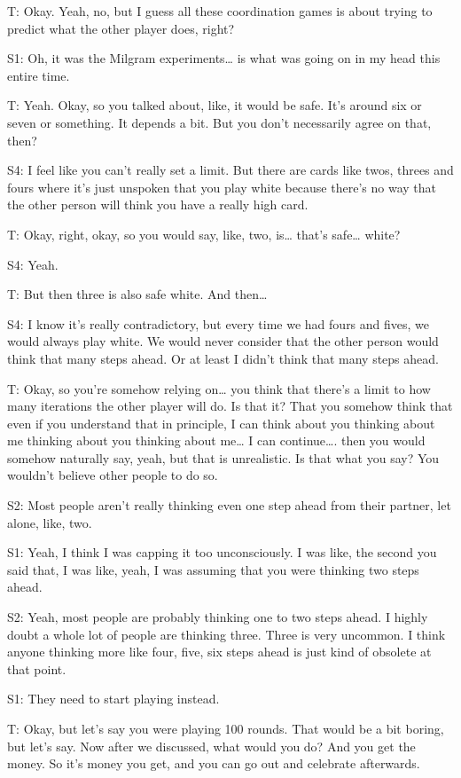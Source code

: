 \documentclass[a4paper,superscriptaddress,nofootinbib]{revtex4}
\begin{document}
T: Okay. Yeah, no, but I guess all these coordination games is about trying to predict what the other player does, right? 

S1: Oh, it was the Milgram experiments… is what was going on in my head this entire time.

T: Yeah. Okay, so you talked about, like, it would be safe. It's around six or seven or something. It depends a bit. But you don't necessarily agree on that, then?

S4: I feel like you can't really set a limit. But there are cards like twos, threes and fours where it's just unspoken that you play white because there's no way that the other person will think you have a really high card.

T: Okay, right, okay, so you would say, like, two, is… that's safe… white? 

S4: Yeah. 

T: But then three is also safe white. And then…

S4: I know it's really contradictory, but every time we had fours and fives, we would always play white. We would never consider that the other person would think that many steps ahead. Or at least I didn't think that many steps ahead. 

T:  Okay, so you're somehow relying on… you think that there's a limit to how many iterations the other player will do. Is that it? That you somehow think that even if you understand that in principle, I can think about you thinking about me thinking about you thinking about me… I can continue…. then you would somehow naturally say, yeah, but that is unrealistic. Is that what you say? You wouldn't believe other people to do so.

S2: Most people aren't really thinking even one step ahead from their partner, let alone, like, two. 

S1: Yeah, I think I was capping it too unconsciously. I was like, the second you said that, I was like, yeah, I was assuming that you were thinking two steps ahead.

S2: Yeah, most people are probably thinking one to two steps ahead. I highly doubt a whole lot of people are thinking three. Three is very uncommon. I think anyone thinking more like four, five, six steps ahead is just kind of obsolete at that point. 

S1: They need to start playing instead. 

T: Okay, but let's say you were playing 100 rounds. That would be a bit boring, but let's say. Now after we discussed, what would you do? And you get the money. So it's money you get, and you can go out and celebrate afterwards. 
\end{document}
